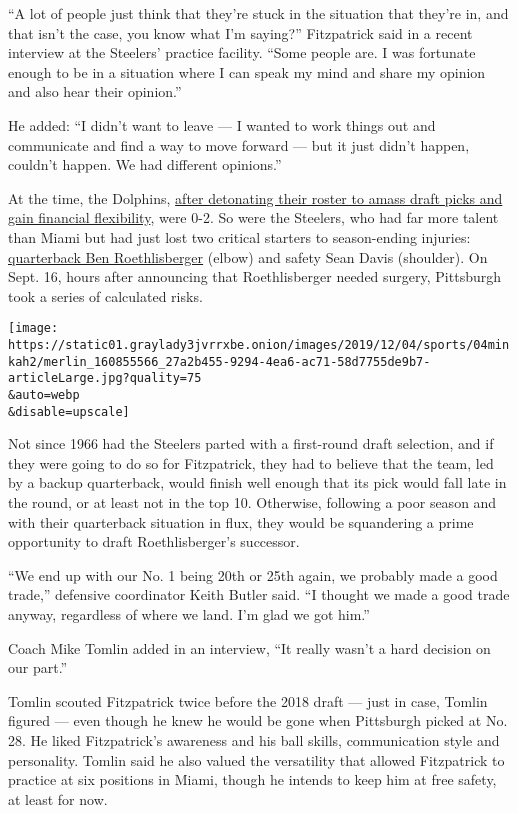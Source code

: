 ``A lot of people just think that they're stuck in the situation that
they're in, and that isn't the case, you know what I'm saying?''
Fitzpatrick said in a recent interview at the Steelers' practice
facility. ``Some people are. I was fortunate enough to be in a situation
where I can speak my mind and share my opinion and also hear their
opinion.''

He added: ``I didn't want to leave --- I wanted to work things out and
communicate and find a way to move forward --- but it just didn't
happen, couldn't happen. We had different opinions.''

At the time, the Dolphins,
\href{https://www.nytimes3xbfgragh.onion/2019/10/13/sports/football/redskins-dolphins.html}{after
detonating their roster to amass draft picks and gain financial
flexibility}, were 0-2. So were the Steelers, who had far more talent
than Miami but had just lost two critical starters to season-ending
injuries:
\href{https://www.nytimes3xbfgragh.onion/2019/09/16/sports/football/ben-roethlisberger-drew-brees-injury.html}{quarterback
Ben Roethlisberger} (elbow) and safety Sean Davis (shoulder). On Sept.
16, hours after announcing that Roethlisberger needed surgery,
Pittsburgh took a series of calculated risks.

\texttt{[image: https://static01.graylady3jvrrxbe.onion/images/2019/12/04/sports/04minkah2/merlin\_160855566\_27a2b455-9294-4ea6-ac71-58d7755de9b7-articleLarge.jpg?quality=75\\\&auto=webp\\\&disable=upscale]}

Not since 1966 had the Steelers parted with a first-round draft
selection, and if they were going to do so for Fitzpatrick, they had to
believe that the team, led by a backup quarterback, would finish well
enough that its pick would fall late in the round, or at least not in
the top 10. Otherwise, following a poor season and with their
quarterback situation in flux, they would be squandering a prime
opportunity to draft Roethlisberger's successor.

``We end up with our No. 1 being 20th or 25th again, we probably made a
good trade,'' defensive coordinator Keith Butler said. ``I thought we
made a good trade anyway, regardless of where we land. I'm glad we got
him.''

Coach Mike Tomlin added in an interview, ``It really wasn't a hard
decision on our part.''

Tomlin scouted Fitzpatrick twice before the 2018 draft --- just in case,
Tomlin figured --- even though he knew he would be gone when Pittsburgh
picked at No. 28. He liked Fitzpatrick's awareness and his ball skills,
communication style and personality. Tomlin said he also valued the
versatility that allowed Fitzpatrick to practice at six positions in
Miami, though he intends to keep him at free safety, at least for now.


